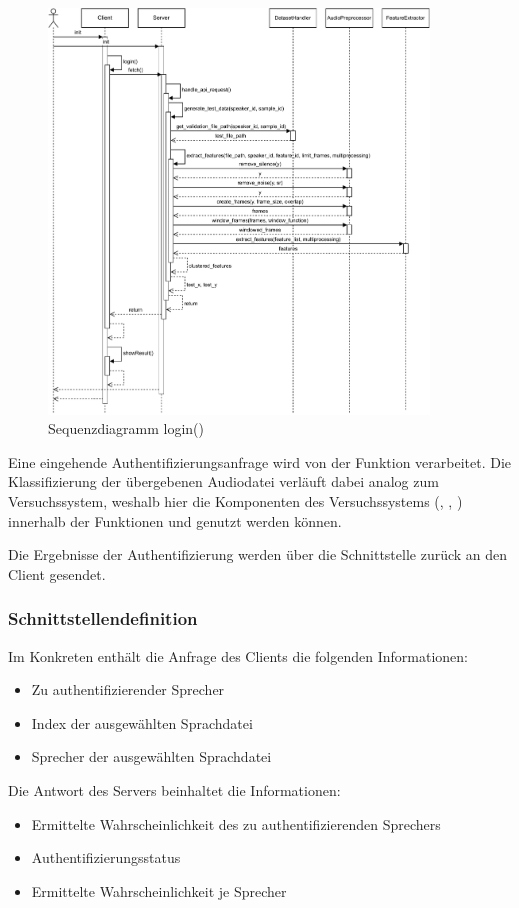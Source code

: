 \begin{figure}[H]
    \centering
    \includegraphics[width=0.9\textwidth, keepaspectratio]{images/SequenzdiagrammClientServer}
    \caption{Sequenzdiagramm login()}
    \label{fig:SequenceHandleApiRequest}
\end{figure}

Eine eingehende Authentifizierungsanfrage wird von der Funktion  verarbeitet.
Die Klassifizierung der übergebenen Audiodatei verläuft dabei analog zum Versuchssystem, weshalb hier die Komponenten des Versuchssystems (, , ) innerhalb der Funktionen  und  genutzt werden können. %

Die Ergebnisse der Authentifizierung werden über die Schnittstelle zurück an den Client gesendet.

\subsubsection{Schnittstellendefinition}
Im Konkreten enthält die Anfrage des Clients die folgenden Informationen:
\begin{itemize}
    \item Zu authentifizierender Sprecher
    \item Index der ausgewählten Sprachdatei
    \item Sprecher der ausgewählten Sprachdatei
\end{itemize}
Die Antwort des Servers beinhaltet die Informationen:
\begin{itemize}
    \item Ermittelte Wahrscheinlichkeit des zu authentifizierenden Sprechers
    \item Authentifizierungsstatus
    \item Ermittelte Wahrscheinlichkeit je Sprecher
\end{itemize}

\textauthor{\vHS}{}{}